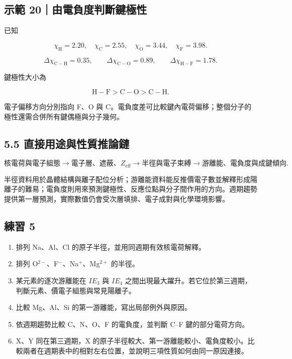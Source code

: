 \documentclass[11pt,a4paper]{article}
\providecommand{\tightlist}{%
  \setlength{\itemsep}{0pt}\setlength{\parskip}{0pt}}
\begin{document}
\begin{HandoutWorkedExample}

\subsection{示範 20｜由電負度判斷鍵極性}\label{ux793aux7bc4-20ux7531ux96fbux8ca0ux5ea6ux5224ux65b7ux9375ux6975ux6027}

已知

\[
\chi_{\mathrm H}=2.20,\quad
\chi_{\mathrm C}=2.55,\quad
\chi_{\mathrm O}=3.44,\quad
\chi_{\mathrm F}=3.98.
\]

\[
\Delta\chi_{\mathrm{C-H}}=0.35,\qquad
\Delta\chi_{\mathrm{C-O}}=0.89,\qquad
\Delta\chi_{\mathrm{H-F}}=1.78.
\]

鍵極性大小為

\[
\mathrm{H-F>C-O>C-H}.
\]

電子偏移方向分別指向 F、O 與 C。電負度差可比較鍵內電荷偏移；整個分子的極性還需合併所有鍵偶極與分子幾何。

\end{HandoutWorkedExample}

\subsection{5.5 直接用途與性質推論鏈}\label{ux76f4ux63a5ux7528ux9014ux8207ux6027ux8ceaux63a8ux8ad6ux93c8}

\[
\text{核電荷與電子組態}
\longrightarrow
\text{電子層、遮蔽、}Z_{\mathrm{eff}}
\longrightarrow
\text{半徑與電子束縛}
\longrightarrow
\text{游離能、電負度與成鍵傾向}.
\]

半徑資料用於晶體結構與離子配位分析；游離能資料能反推價電子數並解釋形成陽離子的難易；電負度則用來預測鍵極性、反應位點與分子間作用的方向。週期趨勢提供第一層預測，實際數值仍會受次層填排、電子成對與化學環境影響。

\subsection{練習 5}\label{ux7df4ux7fd2-5}

\begin{enumerate}
\def\labelenumi{\arabic{enumi}.}
\tightlist
\item
  排列 Na、Al、Cl 的原子半徑，並用同週期有效核電荷解釋。
\item
  排列 O\(^{2-}\)、F\(^-\)、Na\(^+\)、Mg\(^{2+}\) 的半徑。
\item
  某元素的逐次游離能在 \(IE_3\) 與 \(IE_4\) 之間出現最大躍升。若它位於第三週期，判斷元素、價電子組態與常見陽離子。
\item
  比較 Mg、Al、Si 的第一游離能，寫出局部例外與原因。
\item
  依週期趨勢比較 C、N、O、F 的電負度，並判斷 C--F 鍵的部分電荷方向。
\item
  X、Y 同在第三週期，X 的原子半徑較大、第一游離能較小、電負度較小。比較兩者在週期表中的相對左右位置，並說明三項性質如何由同一原因連接。
\end{enumerate}
\end{document}
